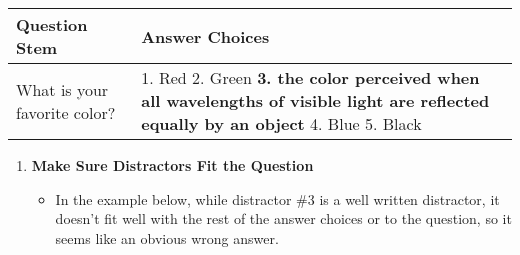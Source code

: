 \documentclass[
]{article}
\providecommand{\tightlist}{%
  \setlength{\itemsep}{0pt}\setlength{\parskip}{0pt}}
\begin{document}
\begin{longtable}[]{@{}ll@{}}
\toprule
\begin{minipage}[b]{0.30\columnwidth}\raggedright
\textbf{Question Stem}\strut
\end{minipage} & \begin{minipage}[b]{0.64\columnwidth}\raggedright
\textbf{Answer Choices}\strut
\end{minipage}\tabularnewline
\midrule
\endhead
\begin{minipage}[t]{0.30\columnwidth}\raggedright
What is your favorite color?\strut
\end{minipage} & \begin{minipage}[t]{0.64\columnwidth}\raggedright
1. Red 2. Green \textbf{3. the color perceived when all wavelengths of visible light are reflected equally by an object} 4. Blue 5. Black\strut
\end{minipage}\tabularnewline
\bottomrule
\end{longtable}

\begin{enumerate}
\def\labelenumi{\arabic{enumi}.}
\setcounter{enumi}{5}
\tightlist
\item
  \textbf{Make Sure Distractors Fit the Question}

  \begin{itemize}
  \tightlist
  \item
    In the example below, while distractor \#3 is a well written distractor, it doesn't fit well with the rest of the answer choices or to the question, so it seems like an obvious wrong answer.
  \end{itemize}
\end{enumerate}
\end{document}
